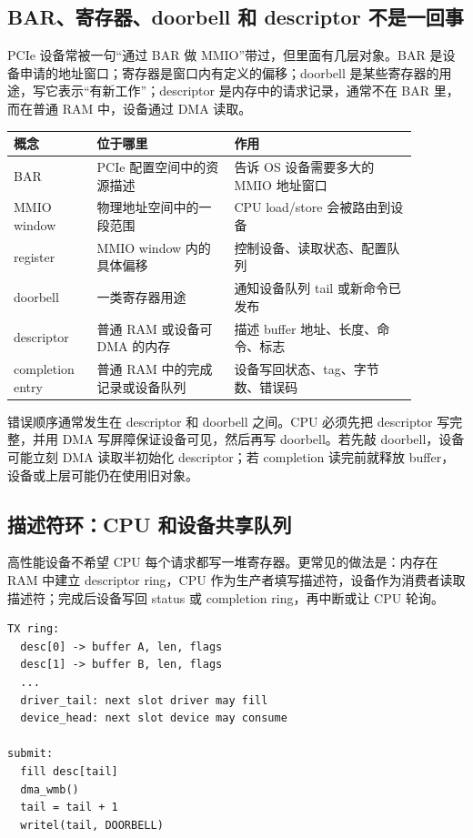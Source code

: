 \subsection{BAR、寄存器、doorbell 和 descriptor 不是一回事}

PCIe 设备常被一句“通过 BAR 做 MMIO”带过，但里面有几层对象。BAR 是设备申请的地址窗口；寄存器是窗口内有定义的偏移；doorbell 是某些寄存器的用途，写它表示“有新工作”；descriptor 是内存中的请求记录，通常不在 BAR 里，而在普通 RAM 中，设备通过 DMA 读取。

\begin{longtable}{p{0.18\linewidth}p{0.30\linewidth}p{0.40\linewidth}}
\toprule
概念 & 位于哪里 & 作用 \\
\midrule
BAR & PCIe 配置空间中的资源描述 & 告诉 OS 设备需要多大的 MMIO 地址窗口 \\
MMIO window & 物理地址空间中的一段范围 & CPU load/store 会被路由到设备 \\
register & MMIO window 内的具体偏移 & 控制设备、读取状态、配置队列 \\
doorbell & 一类寄存器用途 & 通知设备队列 tail 或新命令已发布 \\
descriptor & 普通 RAM 或设备可 DMA 的内存 & 描述 buffer 地址、长度、命令、标志 \\
completion entry & 普通 RAM 中的完成记录或设备队列 & 设备写回状态、tag、字节数、错误码 \\
\bottomrule
\end{longtable}

错误顺序通常发生在 descriptor 和 doorbell 之间。CPU 必须先把 descriptor 写完整，并用 DMA 写屏障保证设备可见，然后再写 doorbell。若先敲 doorbell，设备可能立刻 DMA 读取半初始化 descriptor；若 completion 读完前就释放 buffer，设备或上层可能仍在使用旧对象。

\subsection{描述符环：CPU 和设备共享队列}

高性能设备不希望 CPU 每个请求都写一堆寄存器。更常见的做法是：内存在 RAM 中建立 descriptor ring，CPU 作为生产者填写描述符，设备作为消费者读取描述符；完成后设备写回 status 或 completion ring，再中断或让 CPU 轮询。

\begin{lstlisting}
TX ring:
  desc[0] -> buffer A, len, flags
  desc[1] -> buffer B, len, flags
  ...
  driver_tail: next slot driver may fill
  device_head: next slot device may consume

submit:
  fill desc[tail]
  dma_wmb()
  tail = tail + 1
  writel(tail, DOORBELL)
\end{lstlisting}

